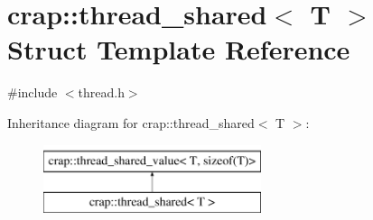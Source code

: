 \hypertarget{structcrap_1_1thread__shared}{\section{crap\+:\+:thread\+\_\+shared$<$ T $>$ Struct Template Reference}
\label{structcrap_1_1thread__shared}
}


{\ttfamily \#include $<$thread.\+h$>$}

Inheritance diagram for crap\+:\+:thread\+\_\+shared$<$ T $>$\+:\begin{figure}[H]
\begin{center}
\leavevmode
\includegraphics[height=2.000000cm]{structcrap_1_1thread__shared}
\end{center}
\end{figure}

